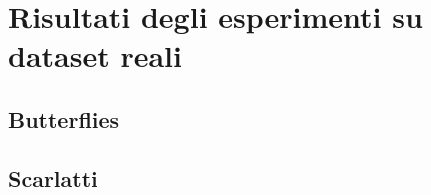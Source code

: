 \section{Risultati degli esperimenti su dataset reali}

\subsection{Butterflies}

\subsection{Scarlatti}